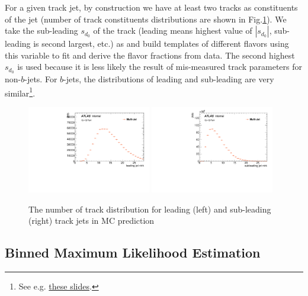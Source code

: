 For a given track jet, by construction we have at least two tracks as constituents of the jet (number of track constituents distributions are shown in Fig.\ref{fig:gbb-ntrk}). We take the sub-leading $s_{d_{0}}$ of the track (leading means highest value of $|s_{d_{0}}|$, sub-leading is second largest, etc.) as \subsdzero and build templates of different flavors using this variable to fit and derive the flavor fractions from data.   The second highest $s_{d_{0}}$ is used because it is less likely the result of mis-measured track parameters for non-$b$-jets.  For $b$-jets, the distributions of leading and sub-leading are very similar\footnote{See e.g. \href{https://indico.cern.ch/event/642521/contributions/2607425/subcontributions/230337/attachments/1517581/2369090/gbb_09_03_ZihaoJiang_Rel21Scrutiny.pdf}{these slides}.}. 


\begin{figure}[htbp]
  \centering
 \includegraphics[width=0.48\textwidth]{figures/gbb/Leading_trkjet_ntrk_PostTag.pdf}
 \includegraphics[width=0.48\textwidth]{figures/gbb/SubLeading_trkjet_ntrk_PostTag.pdf}\\
\caption{The number of track distribution for leading (left) and sub-leading (right) track jets in MC prediction}
  \label{fig:gbb-ntrk}
\end{figure}



\subsection{Binned Maximum Likelihood Estimation}

